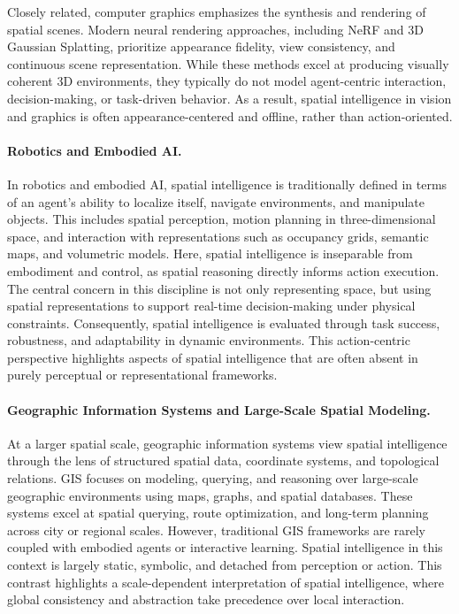 Closely related, computer graphics emphasizes the synthesis and rendering of spatial scenes.
Modern neural rendering approaches, including NeRF and 3D Gaussian Splatting, prioritize appearance fidelity, view consistency, and continuous scene representation.
While these methods excel at producing visually coherent 3D environments, they typically do not model agent-centric interaction, decision-making, or task-driven behavior.
As a result, spatial intelligence in vision and graphics is often appearance-centered and offline, rather than action-oriented.



\paragraph{Robotics and Embodied AI.}
In robotics and embodied AI, spatial intelligence is traditionally defined in terms of an agent’s ability to localize itself, navigate environments, and manipulate objects.
This includes spatial perception, motion planning in three-dimensional space, and interaction with representations such as occupancy grids, semantic maps, and volumetric models.
Here, spatial intelligence is inseparable from embodiment and control, as spatial reasoning directly informs action execution.
The central concern in this discipline is not only representing space, but using spatial representations to support real-time decision-making under physical constraints.
Consequently, spatial intelligence is evaluated through task success, robustness, and adaptability in dynamic environments.
This action-centric perspective highlights aspects of spatial intelligence that are often absent in purely perceptual or representational frameworks.



\paragraph{Geographic Information Systems and Large-Scale Spatial Modeling.}
At a larger spatial scale, geographic information systems view spatial intelligence through the lens of structured spatial data, coordinate systems, and topological relations.
GIS focuses on modeling, querying, and reasoning over large-scale geographic environments using maps, graphs, and spatial databases.
These systems excel at spatial querying, route optimization, and long-term planning across city or regional scales.
However, traditional GIS frameworks are rarely coupled with embodied agents or interactive learning.
Spatial intelligence in this context is largely static, symbolic, and detached from perception or action.
This contrast highlights a scale-dependent interpretation of spatial intelligence, where global consistency and abstraction take precedence over local interaction.



